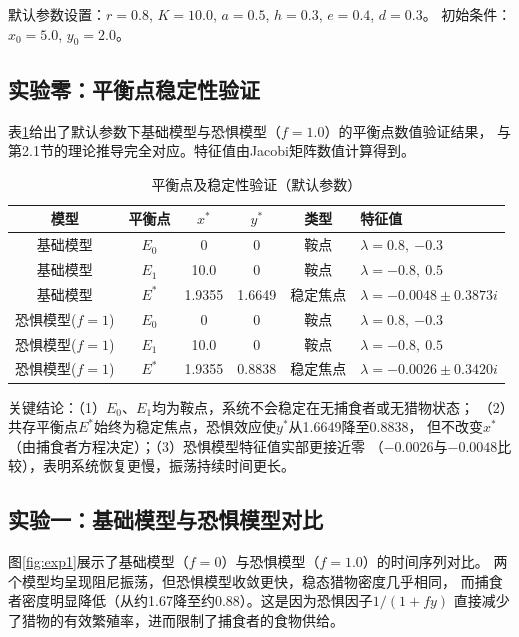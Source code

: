 \documentclass[UTF8]{ctexart}
\begin{document}
默认参数设置：$r = 0.8$, $K = 10.0$, $a = 0.5$, $h = 0.3$, $e = 0.4$, $d = 0.3$。
初始条件：$x_0 = 5.0$, $y_0 = 2.0$。

\subsection{实验零：平衡点稳定性验证}

表\ref{tab:stability}给出了默认参数下基础模型与恐惧模型（$f=1.0$）的平衡点数值验证结果，
与第2.1节的理论推导完全对应。特征值由Jacobi矩阵数值计算得到。

\begin{table}[H]
\centering
\caption{平衡点及稳定性验证（默认参数）}
\label{tab:stability}
\begin{tabular}{c|c|c|c|c|l}
\hline
\textbf{模型} & \textbf{平衡点} & $x^*$ & $y^*$ & \textbf{类型} & \textbf{特征值} \\
\hline
基础模型 & $E_0$ & 0      & 0      & 鞍点     & $\lambda = 0.8,\ {-0.3}$ \\
基础模型 & $E_1$ & 10.0   & 0      & 鞍点     & $\lambda = {-0.8},\ 0.5$ \\
基础模型 & $E^*$ & 1.9355 & 1.6649 & 稳定焦点 & $\lambda = {-0.0048} \pm 0.3873i$ \\
\hline
恐惧模型($f\!=\!1$) & $E_0$ & 0      & 0      & 鞍点     & $\lambda = 0.8,\ {-0.3}$ \\
恐惧模型($f\!=\!1$) & $E_1$ & 10.0   & 0      & 鞍点     & $\lambda = {-0.8},\ 0.5$ \\
恐惧模型($f\!=\!1$) & $E^*$ & 1.9355 & 0.8838 & 稳定焦点 & $\lambda = {-0.0026} \pm 0.3420i$ \\
\hline
\end{tabular}
\end{table}

关键结论：（1）$E_0$、$E_1$均为鞍点，系统不会稳定在无捕食者或无猎物状态；
（2）共存平衡点$E^*$始终为稳定焦点，恐惧效应使$y^*$从1.6649降至0.8838，
但不改变$x^*$（由捕食者方程决定）；（3）恐惧模型特征值实部更接近零
（$-0.0026$与$-0.0048$比较），表明系统恢复更慢，振荡持续时间更长。

\subsection{实验一：基础模型与恐惧模型对比}

图\ref{fig:exp1}展示了基础模型（$f=0$）与恐惧模型（$f=1.0$）的时间序列对比。
两个模型均呈现阻尼振荡，但恐惧模型收敛更快，稳态猎物密度几乎相同，
而捕食者密度明显降低（从约1.67降至约0.88）。这是因为恐惧因子$1/(1+fy)$
直接减少了猎物的有效繁殖率，进而限制了捕食者的食物供给。
\end{document}

